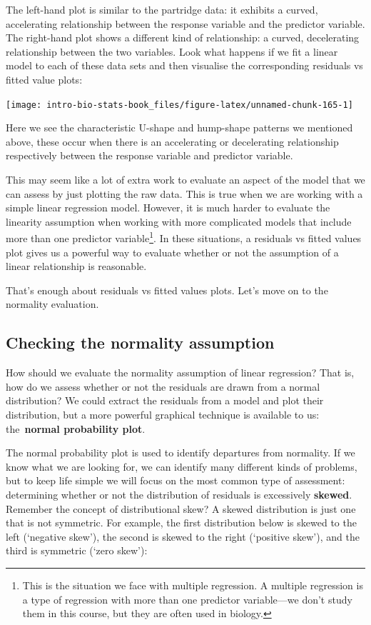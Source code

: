 \documentclass[
]{book}
\begin{document}
The left-hand plot is similar to the partridge data: it exhibits a curved, accelerating relationship between the response variable and the predictor variable. The right-hand plot shows a different kind of relationship: a curved, decelerating relationship between the two variables. Look what happens if we fit a linear model to each of these data sets and then visualise the corresponding residuals vs fitted value plots:

\begin{center}\texttt{[image: intro-bio-stats-book\_files/figure-latex/unnamed-chunk-165-1]} \end{center}

Here we see the characteristic U-shape and hump-shape patterns we mentioned above, these occur when there is an accelerating or decelerating relationship respectively between the response variable and predictor variable.

This may seem like a lot of extra work to evaluate an aspect of the model that we can assess by just plotting the raw data. This is true when we are working with a simple linear regression model. However, it is much harder to evaluate the linearity assumption when working with more complicated models that include more than one predictor variable\footnote{This is the situation we face with multiple regression. A multiple regression is a type of regression with more than one predictor variable---we don't study them in this course, but they are often used in biology.}. In these situations, a residuals vs fitted values plot gives us a powerful way to evaluate whether or not the assumption of a linear relationship is reasonable.

That's enough about residuals vs fitted values plots. Let's move on to the normality evaluation.

\hypertarget{checking-the-normality-assumption}{%
\subsection{Checking the normality assumption}\label{checking-the-normality-assumption}}

How should we evaluate the normality assumption of linear regression? That is, how do we assess whether or not the residuals are drawn from a normal distribution? We could extract the residuals from a model and plot their distribution, but a more powerful graphical technique is available to us: the~\textbf{normal probability plot}.

The normal probability plot is used to identify departures from normality. If we know what we are looking for, we can identify many different kinds of problems, but to keep life simple we will focus on the most common type of assessment: determining whether or not the distribution of residuals is excessively \textbf{skewed}. Remember the concept of distributional skew? A skewed distribution is just one that is not symmetric. For example, the first distribution below is skewed to the left (`negative skew'), the second is skewed to the right (`positive skew'), and the third is symmetric (`zero skew'):
\end{document}
